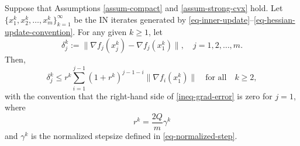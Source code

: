 \documentclass[final,numbook]{svjour3}
\begin{document}
\begin{lemma}\label{lemm-bound-delta-jk} Suppose that Assumptions \ref{assum-compact} and \ref{assum-strong-cvx} hold. Let $\{x_1^k,x_2^k,\dots,x_m^k\}_{k=1}^\infty$ be the IN iterates generated by \eqref{eq-inner-update}--\eqref{eq-hessian-update-convention}. For any given $k\geq 1$, let 
 \begin{equation}\label{def-delta-jk} \delta_j^k := \| \nabla f_j(x_j^k) - \nabla f_j(x_1^k) \|, \quad j=1,2,\dots,m. 
 \end{equation}
Then, 
  \begin{equation}\label{ineq-grad-error} \delta_j^k \leq r^k \sum_{i=1}^{j-1} (1+r^k)^{j-1-i} \| \nabla f_i(x_1^k)\| \quad \mbox{for all} \quad k\geq 2,
  \end{equation}
with the convention that the right-hand side of \eqref{ineq-grad-error} is zero for $j=1$, where 
    \begin{equation}\label{def-rk} r^k = \frac{2Q}{m}\gamma^k
    \end{equation}  
and $\gamma^k$ is the normalized stepsize defined in \eqref{eq-normalized-step}.
\end{lemma}
\end{document}
